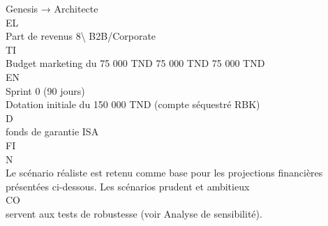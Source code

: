 \documentclass[12pt,landscape,a4paper]{article}
\begin{document}
Genesis → Architecte\\
\vspace{0.5em}
\vspace{0.5em}
\vspace{0.5em}
\vspace{0.5em}
EL\\
Part de revenus              8\textbackslash{}%
B2B/Corporate\\
\vspace{0.5em}
\vspace{0.5em}
\vspace{0.5em}
\vspace{0.5em}
TI\\
Budget marketing du      75 000 TND 75 000 TND 75 000 TND\\
\vspace{0.5em}
\vspace{0.5em}
\vspace{0.5em}
\vspace{0.5em}
EN\\
Sprint 0 (90 jours)\\
Dotation initiale du     150 000 TND (compte séquestré RBK)\\
\vspace{0.5em}
\vspace{0.5em}
\vspace{0.5em}
\vspace{0.5em}
D\\
fonds de garantie ISA\\
\vspace{0.5em}
\vspace{0.5em}
\vspace{0.5em}
\vspace{0.5em}
FI\\
N\\
Le scénario réaliste est retenu comme base pour les projections financières présentées ci-dessous. Les scénarios prudent et ambitieux\\
CO\\
servent aux tests de robustesse (voir Analyse de sensibilité).\\
\vspace{0.5em}
\vspace{0.5em}
\end{document}

